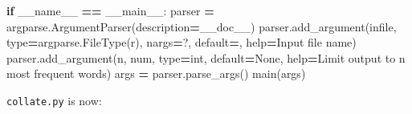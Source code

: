 \documentclass[
]{krantz}
\makeatletter
\newenvironment{Shaded}{\begin{snugshade}}{\end{snugshade}}
\newcommand{\BuiltInTok}[1]{#1}
\newcommand{\ControlFlowTok}[1]{\textcolor[rgb]{0.13,0.29,0.53}{\textbf{#1}}}
\newcommand{\NormalTok}[1]{#1}
\newcommand{\OperatorTok}[1]{\textcolor[rgb]{0.81,0.36,0.00}{\textbf{#1}}}
\newcommand{\StringTok}[1]{\textcolor[rgb]{0.31,0.60,0.02}{#1}}
\newcommand{\VariableTok}[1]{\textcolor[rgb]{0.00,0.00,0.00}{#1}}
\newenvironment{kframe}{%
\medskip{}
\setlength{\fboxsep}{.8em}
 \def\at@end@of@kframe{}%
 \ifinner\ifhmode%
  \def\at@end@of@kframe{\end{minipage}}%
  \begin{minipage}{\columnwidth}%
 \fi\fi%
 \def\FrameCommand##1{\hskip\@totalleftmargin \hskip-\fboxsep
 \colorbox{shadecolor}{##1}\hskip-\fboxsep
     \hskip-\linewidth \hskip-\@totalleftmargin \hskip\columnwidth}%
 \MakeFramed {\advance\hsize-\width
   \@totalleftmargin\z@ \linewidth\hsize
   \@setminipage}}%
 {\par\unskip\endMakeFramed%
 \at@end@of@kframe}
\renewenvironment{Shaded}{\begin{kframe}}{\end{kframe}}
\makeatother
\begin{document}
\begin{Shaded}
\begin{Highlighting}[]
\ControlFlowTok{if} \VariableTok{\_\_name\_\_} \OperatorTok{==} \StringTok{\textquotesingle{}\_\_main\_\_\textquotesingle{}}\NormalTok{:}
\NormalTok{    parser }\OperatorTok{=}\NormalTok{ argparse.ArgumentParser(description}\OperatorTok{=}\NormalTok{\_\_doc\_\_)}
\NormalTok{    parser.add\_argument(}\StringTok{\textquotesingle{}infile\textquotesingle{}}\NormalTok{, }\BuiltInTok{type}\OperatorTok{=}\NormalTok{argparse.FileType(}\StringTok{\textquotesingle{}r\textquotesingle{}}\NormalTok{), nargs}\OperatorTok{=}\StringTok{\textquotesingle{}?\textquotesingle{}}\NormalTok{,}
\NormalTok{                        default}\OperatorTok{=}\StringTok{\textquotesingle{}{-}\textquotesingle{}}\NormalTok{, }\BuiltInTok{help}\OperatorTok{=}\StringTok{\textquotesingle{}Input file name\textquotesingle{}}\NormalTok{)}
\NormalTok{    parser.add\_argument(}\StringTok{\textquotesingle{}{-}n\textquotesingle{}}\NormalTok{, }\StringTok{\textquotesingle{}{-}{-}num\textquotesingle{}}\NormalTok{, }\BuiltInTok{type}\OperatorTok{=}\BuiltInTok{int}\NormalTok{, default}\OperatorTok{=}\VariableTok{None}\NormalTok{,}
                        \BuiltInTok{help}\OperatorTok{=}\StringTok{\textquotesingle{}Limit output to n most frequent words\textquotesingle{}}\NormalTok{)}
\NormalTok{    args }\OperatorTok{=}\NormalTok{ parser.parse\_args()}
\NormalTok{    main(args)}
\end{Highlighting}
\end{Shaded}

\texttt{collate.py} is now:
\end{document}
